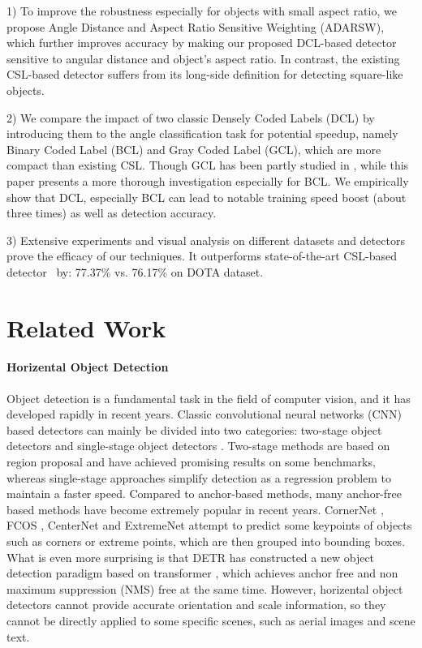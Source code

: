 \documentclass[final]{cvpr}
\begin{document}
1) To improve the robustness especially for objects with small aspect ratio, we propose Angle Distance and Aspect Ratio Sensitive Weighting (ADARSW), which further improves accuracy by making our proposed DCL-based detector sensitive to angular distance and object's aspect ratio. In contrast, the existing CSL-based detector suffers from its long-side definition for detecting square-like objects.

2) We compare the impact of two classic Densely Coded Labels (DCL) by introducing them to the angle classification task for potential speedup, namely Binary Coded Label (BCL) and Gray Coded Label (GCL), which are more compact than existing CSL. Though GCL has been partly studied in \cite{yang2020on}, while this paper presents a more thorough investigation especially for BCL. We empirically show that DCL, especially BCL can lead to notable training speed boost (about three times) as well as detection accuracy.



3) Extensive experiments and visual analysis on different datasets and detectors prove the efficacy of our techniques. It outperforms state-of-the-art CSL-based detector~\cite{yang2020arbitrary} by: 77.37\% vs. 76.17\% on DOTA dataset.

\section{Related Work}
\paragraph{Horizental Object Detection}
Object detection is a fundamental task in the field of computer vision, and it has developed rapidly in recent years. Classic convolutional neural networks (CNN) based detectors can mainly be divided into two categories: two-stage object detectors \cite{girshick2015fast,ren2015faster,dai2016r,lin2017feature} and single-stage object detectors \cite{redmon2016you,liu2016ssd,lin2017focal}. Two-stage methods are based on region proposal and have achieved promising results on some benchmarks, whereas single-stage approaches simplify detection as a regression problem to maintain a faster speed. Compared to anchor-based methods, many anchor-free based methods have become extremely popular in recent years. CornerNet \cite{law2018cornernet}, FCOS \cite{tian2019fcos}, CenterNet \cite{duan2019centernet} and ExtremeNet \cite{zhou2019bottom} attempt to predict some keypoints of objects such as corners or extreme points, which are then grouped into bounding boxes. What is even more surprising is that DETR \cite{carion2020end} has constructed a new object detection paradigm based on transformer \cite{vaswani2017attention}, which achieves anchor free and non maximum suppression (NMS) free at the same time. However, horizental object detectors cannot provide accurate orientation and scale information, so they cannot be directly applied to some specific scenes, such as aerial images and scene text.
\end{document}
